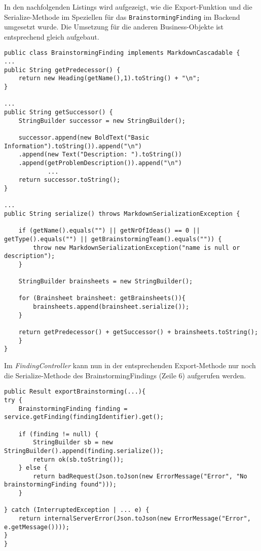In den nachfolgenden Listings wird aufgezeigt, wie die Export-Funktion und die Serialize-Methode im Speziellen für das \texttt{BrainstormingFinding} im Backend umgesetzt wurde. Die Umsetzung für die anderen Business-Objekte ist entsprechend gleich aufgebaut. 

\begin{lstlisting}[caption={Serialize-Methode von BrainstormingFinding}, label=markdownBrainstormingFinding]
public class BrainstormingFinding implements MarkdownCascadable {
...
public String getPredecessor() {
    return new Heading(getName(),1).toString() + "\n";
}

...
public String getSuccessor() {
    StringBuilder successor = new StringBuilder();

    successor.append(new BoldText("Basic Information").toString()).append("\n")
    .append(new Text("Description: ").toString())
    .append(getProblemDescription()).append("\n")
            ...
    return successor.toString();
}

...
public String serialize() throws MarkdownSerializationException {

    if (getName().equals("") || getNrOfIdeas() == 0 || getType().equals("") || getBrainstormingTeam().equals("")) {
        throw new MarkdownSerializationException("name is null or description");
    }

    StringBuilder brainsheets = new StringBuilder();

    for (Brainsheet brainsheet: getBrainsheets()){
        brainsheets.append(brainsheet.serialize());
    }
    
    return getPredecessor() + getSuccessor() + brainsheets.toString();
	}
}

\end{lstlisting}

Im \textit{FindingController} kann nun in der entsprechenden Export-Methode nur noch die Serialize-Methode des BrainstormingFindings (Zeile 6) aufgerufen werden.

\begin{lstlisting}[caption={Export-Methode vom FindingController}, label=markdownFindingController]
public Result exportBrainstorming(...){
try {
    BrainstormingFinding finding = service.getFinding(findingIdentifier).get();

    if (finding != null) {
        StringBuilder sb = new StringBuilder().append(finding.serialize());
        return ok(sb.toString());
    } else {
        return badRequest(Json.toJson(new ErrorMessage("Error", "No brainstormingFinding found")));
    }

} catch (InterruptedException | ... e) {
    return internalServerError(Json.toJson(new ErrorMessage("Error", e.getMessage())));
}
}
\end{lstlisting}

